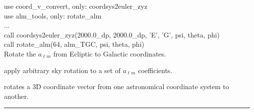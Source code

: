 \begin{example}
{
use coord\_v\_convert, only: coordsys2euler\_zyz \\
use alm\_tools, only: rotate\_alm \\
...\\
call coordsys2euler\_zyz(2000.0\_dp, 2000.0\_dp, 'E', 'G', psi, theta, phi) \\
call rotate\_alm(64, alm\_TGC, psi, theta, phi)  \\
}
{
Rotate the $a_{\ell m}$ from Ecliptic to Galactic coordinates.
}
\end{example}


\begin{related}
  \begin{sulist}{} %
  \item[\htmlref{rotate\_alm}{sub:rotate_alm}] apply arbitrary sky rotation to a
  set of $a_{\ell m}$ coefficients.
  \item[\htmlref{xcc\_v\_convert}{sub:xcc_v_convert}] rotates a 3D coordinate
vector from one astronomical coordinate system to another.
  \end{sulist}
\end{related}

\rule{\hsize}{2mm}

\newpage
